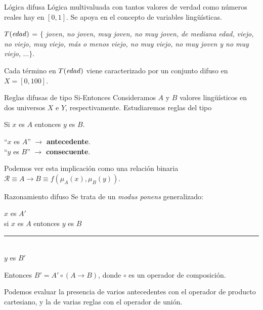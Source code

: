 \documentclass[spanish]{beamer}
\begin{document}
\begin{frame}{Lógica difusa}
	Lógica multivaluada con tantos valores de verdad como números reales hay en $[0,1]$. Se apoya en el concepto de variables lingüísticas.

  \pause
  \begin{example}
$T(\text{\textit{edad}})$ = $\{$ \textit{joven, no joven, muy joven, no muy joven,} \textit{de mediana edad,} \textit{viejo, no viejo, muy viejo, más o menos viejo, no muy viejo,} \textit{no muy joven y no muy viejo, }$\dots \}$.

Cada término en $T(\text{\textit{edad}})$ viene caracterizado por un conjunto difuso en $X=[0,100]$.
\end{example}
\end{frame}

\begin{frame}{Reglas difusas de tipo Si-Entonces}
	Consideramos $A$ y $B$ valores lingüísticos en dos universos $X$ e $Y$, respectivamente. Estudiaremos reglas del tipo\\

\begin{center}
	Si $x$ es $A$ entonces $y$ es $B$.
\end{center}

``$x$ es $A$'' $\rightarrow$ \textbf{antecedente}.\\
``$y$ es $B$'' $\rightarrow$ \textbf{consecuente}.

Podemos ver esta implicación como una relación binaria $\mathcal R \equiv A \to B \equiv f(\mu_A(x), \mu_B(y))$.
\end{frame}

\begin{frame}{Razonamiento difuso}
Se trata de un \textit{modus ponens} generalizado:
\begin{center}
	$x$ es $A'$\\
    si $x$ es $A$ entonces $y$ es $B$\\
    \rule{7cm}{0.4pt}\\
    $y$ es $B'$
\end{center}

Entonces $B' = A' \circ (A \to B)$, donde $\circ$ es un operador de composición.
\pause

Podemos evaluar la presencia de varios antecedentes con el operador de producto cartesiano, y la de varias reglas con el operador de unión.

\end{frame}
\end{document}
